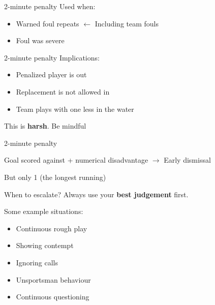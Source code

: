 \documentclass{beamer}
\begin{document}
	\begin{frame}{2-minute penalty}
		Used when:
		\begin{itemize}
			\item Warned foul repeats $\leftarrow$ Including team fouls
			\item Foul was severe
		\end{itemize}
	\end{frame}

	\begin{frame}{2-minute penalty}
		Implications:
		\begin{itemize}
			\item Penalized player is out
			\item Replacement is not allowed in
			\item Team plays with one less in the water
		\end{itemize}

		\pause

		This is \textbf{harsh}. Be mindful
	\end{frame}

	\begin{frame}{2-minute penalty}
		\begin{center}
			Goal scored against + numerical disadvantage $\rightarrow$ Early dismissal

			But only 1 (the longest running)
		\end{center}
	\end{frame}

	\begin{frame}{When to escalate?}
		Always use your \textbf{best judgement} first.

		\pause

		Some example situations:
		\begin{itemize}
			\item Continuous rough play
			\item Showing contempt
			\item Ignoring calls
			\item Unsportsman behaviour
			\item Continuous questioning
		\end{itemize}
	\end{frame}
\end{document}
